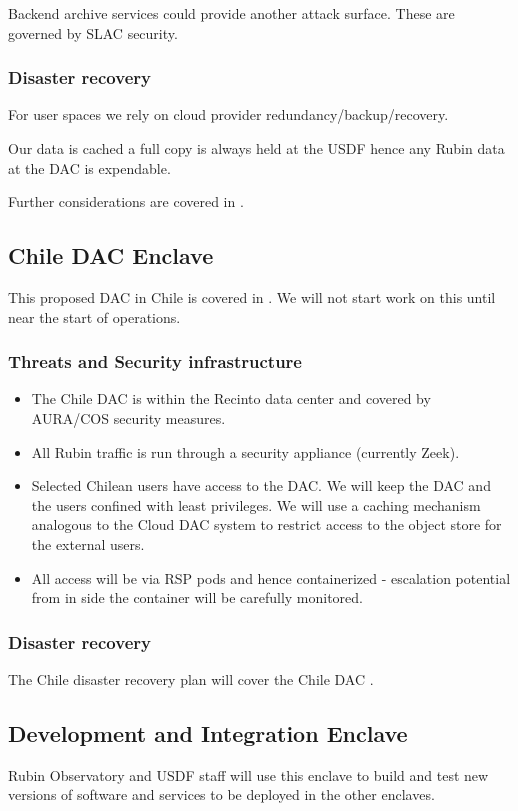 Backend archive services could provide another attack surface.
These are governed by \gls{SLAC} security.

\subsubsection{Disaster recovery}
For user  spaces we rely on cloud provider redundancy/backup/recovery.

Our data is cached a full copy is always held at the \gls{USDF} hence any Rubin data at the DAC is expendable.

Further considerations are covered in .

\subsection{ Chile \gls{DAC} Enclave}
This proposed DAC in Chile is covered in \cite{LDM-572}.
We will not start work on this until near the start of operations.
\subsubsection{ Threats and Security infrastructure}

\begin{itemize}
\item The Chile DAC is within the Recinto data center and covered by AURA/COS security measures.\item All Rubin traffic is run through a security appliance (currently Zeek).
\item Selected Chilean users have access to the DAC. We will keep the DAC and the users confined with least privileges. We will use a caching mechanism analogous to the Cloud DAC system to restrict access to the object store for the external users.
\item All access will be via \gls{RSP} pods and hence containerized - escalation potential from in side the container will be carefully monitored.
\end{itemize}
\subsubsection{Disaster recovery}
The Chile disaster recovery plan will cover the Chile \gls{DAC} .

\subsection{Development and Integration  \gls{Enclave}}
Rubin Observatory and \gls{USDF} staff will use this enclave to build and test new versions of software and services to be deployed in the other enclaves.

